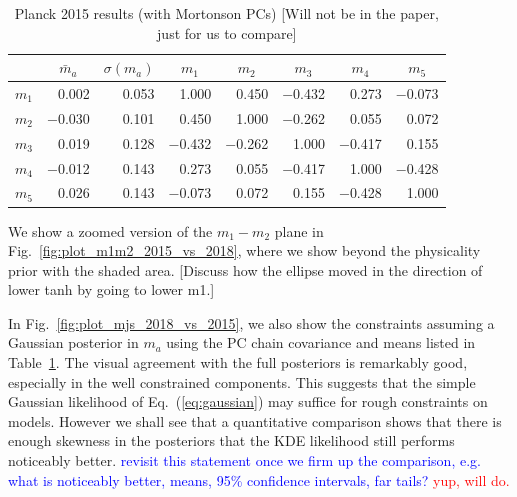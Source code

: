 \documentclass[prd,twocolumn,amsmath,amssymb,floatfix,superscriptaddress,nofootinbib]{revtex4-1}
\newcommand{\wh}[1]{\textcolor{blue}{#1}}
\newcommand{\ch}[1]{\textcolor{red}{#1}}
\begin{document}
\begin{table}[b]
\centering
\caption{Planck 2015 results (with Mortonson PCs) [Will not be in the paper, just for us to compare] }
\label{tab:PC_stats}
\begin{tabular}{|r | r r@{\hskip 0.06in}|r r r r r|}
\hline
		
			  &  \multicolumn{1}{c}{$\bar m_a$} & \multicolumn{1}{c}{$\sigma(m_a)$}	 & \multicolumn{1}{|c}{$m_1$} & \multicolumn{1}{c}{$m_2$} & \multicolumn{1}{c}{$m_3$} & \multicolumn{1}{c}{$m_4$} & \multicolumn{1}{c|}{$m_5$} 
		\\ \hline

$m_1$ 
	& 0.002 & 0.053 & 1.000 & 0.450 & $-$0.432 & 0.273 & $-$0.073 \\ 
$m_2$ 
	& $-$0.030 &  0.101 & 0.450 & 1.000 & $-$0.262 & 0.055 & 0.072 \\ 
$m_3$ 
	& 0.019 &  0.128 & $-$0.432 & $-$0.262 &1.000 & $-$0.417 & 0.155 \\
$m_4$  
	& $-$0.012 & 0.143 &  0.273 & 0.055 & $-$0.417 & 1.000 & $-$0.428 \\ 
$m_5$ 
	& 0.026 & 0.143 & $-$0.073 & 0.072 & 0.155 & $-$0.428 & 1.000\\ 
\hline
\end{tabular}
\end{table}


We show a zoomed version of the $m_1-m_2$ plane in Fig.~\ref{fig:plot_m1m2_2015_vs_2018}, where we show beyond the physicality prior with the shaded area. [Discuss how the ellipse moved in the direction of lower tanh by going to lower m1.] 


In Fig.~\ref{fig:plot_mjs_2018_vs_2015}, we also show the constraints assuming a Gaussian posterior in $m_a$ using the PC chain covariance and means listed in Table~\ref{tab:PC_stats}.  The visual agreement with the full posteriors is remarkably good, especially in the well constrained components.  This suggests that the simple Gaussian  likelihood of Eq.~(\ref{eq:gaussian}) may suffice for rough constraints on models.    However we shall see that a quantitative comparison shows that there is enough skewness in the posteriors that the KDE likelihood 
still performs noticeably better.  \wh{revisit this 
statement once we firm up the comparison, e.g. what is noticeably better, means, 95\% confidence intervals, far tails?} \ch{yup, will do.}

\end{document}
